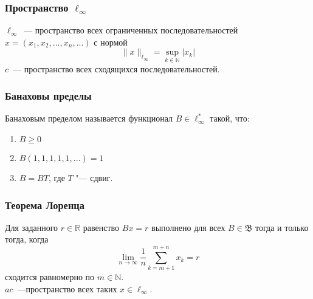 \begin{varwidth}[V]{0.3\linewidth}
	\frametitle{Пространство $\ell_\infty$}
	$\ell_\infty$~--- пространство всех ограниченных последовательностей
	$x=(x_1, x_2, ..., x_n, ...)$
	с нормой
	$$
		\|x\|_{\ell_\infty} = \sup_{k\in\mathbb{N}} |x_k|
	$$
	$c$~--- пространство всех сходящихся последовательностей.
\end{varwidth}
 \hfill
\begin{varwidth}[V]{0.25\linewidth}
	\frametitle{Банаховы пределы}
	Банаховым пределом называется функционал $B\in \ell_\infty^*$ такой, что:
	\begin{enumerate}
		\item
			$B \geqslant 0$
		\item
			$B(1,1,1,1,1,...) = 1$
		\item
			$B=BT$, где $T$ "--- сдвиг.
	\end{enumerate}
\end{varwidth}
 \hfill
\begin{varwidth}[V]{0.35\linewidth}
\frametitle{Теорема Лоренца}
	Для заданного $r\in\mathbb{R}$ равенство $Bx=r$ выполнено для всех $B\in\mathfrak{B}$
	тогда и только тогда, когда
	\begin{equation*}
		\lim_{n\to\infty} \frac{1}{n} \sum_{k=m+1}^{m+n} x_k = r
	\end{equation*}
	сходится равномерно по $m\in\mathbb{N}$.
	\\
	$ac$~---пространство всех таких $x \in \ell_\infty$.
\end{varwidth}
